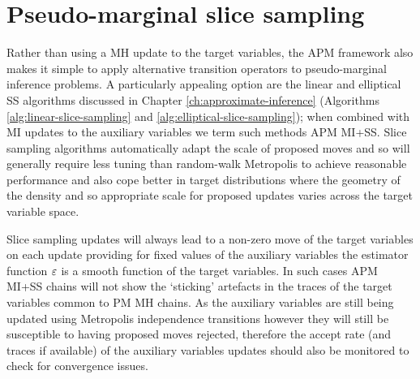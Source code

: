 
\section{Pseudo-marginal slice sampling}

Rather than using a \ac{MH} update to the target variables, the \ac{APM} framework also makes it simple to apply alternative transition operators to pseudo-marginal inference problems. A particularly appealing option are the linear and elliptical \ac{SS} algorithms discussed in Chapter \ref{ch:approximate-inference} (Algorithms \ref{alg:linear-slice-sampling} and \ref{alg:elliptical-slice-sampling}); when combined with \ac{MI} updates to the auxiliary variables we term such methods \ac{APM} \ac{MI}+\ac{SS}. Slice sampling algorithms automatically adapt the scale of proposed moves and so will generally require less tuning than random-walk Metropolis to achieve reasonable performance and also cope better in target distributions where the geometry of the density and so appropriate scale for proposed updates varies across the target variable space.

Slice sampling updates will always lead to a non-zero move of the target variables on each update providing for fixed values of the auxiliary variables the estimator function $\varepsilon$ is a smooth function of the target variables. In such cases \ac{APM} \ac{MI}+\ac{SS} chains will not show the `sticking' artefacts in the traces of the target variables common to \ac{PM} \ac{MH} chains. As the auxiliary variables are still being updated using Metropolis independence transitions however they will still be susceptible to having proposed moves rejected, therefore the accept rate (and traces if available) of the auxiliary variables updates should also be monitored to check for convergence issues. %
	
